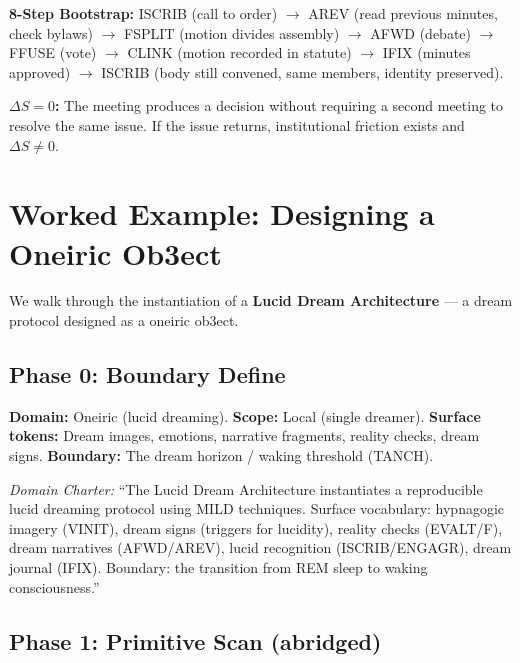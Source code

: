 \documentclass[12pt,a4paper]{article}
\begin{document}
\textbf{8-Step Bootstrap:} ISCRIB (call to order) $\to$ AREV (read previous minutes,
check bylaws) $\to$ FSPLIT (motion divides assembly) $\to$ AFWD (debate) $\to$ FFUSE
(vote) $\to$ CLINK (motion recorded in statute) $\to$ IFIX (minutes approved)
$\to$ ISCRIB (body still convened, same members, identity preserved).

\textbf{$\Delta S = 0$:} The meeting produces a decision without requiring a second
meeting to resolve the same issue. If the issue returns, institutional friction
exists and $\Delta S \neq 0$.

\section{Worked Example: Designing a Oneiric Ob3ect}

We walk through the instantiation of a \textbf{Lucid Dream Architecture} — a dream
protocol designed as a oneiric ob3ect.

\subsection*{Phase 0: Boundary Define}

\textbf{Domain:} Oneiric (lucid dreaming). \textbf{Scope:} Local (single dreamer).
\textbf{Surface tokens:} Dream images, emotions, narrative fragments, reality checks,
dream signs. \textbf{Boundary:} The dream horizon / waking threshold (TANCH).

{\it Domain Charter:} ``The Lucid Dream Architecture instantiates a reproducible
lucid dreaming protocol using MILD techniques. Surface vocabulary: hypnagogic imagery
(VINIT), dream signs (triggers for lucidity), reality checks (EVALT/F), dream
narratives (AFWD/AREV), lucid recognition (ISCRIB/ENGAGR), dream journal (IFIX).
Boundary: the transition from REM sleep to waking consciousness.''

\subsection*{Phase 1: Primitive Scan (abridged)}
\end{document}
